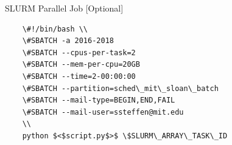 \documentclass{beamer}
\begin{document}
\begin{frame}{SLURM Parallel Job [Optional]}
    \begin{verbatim}
    \#!/bin/bash \\
    \#SBATCH -a 2016-2018
    \#SBATCH --cpus-per-task=2
    \#SBATCH --mem-per-cpu=20GB
    \#SBATCH --time=2-00:00:00
    \#SBATCH --partition=sched\_mit\_sloan\_batch
    \#SBATCH --mail-type=BEGIN,END,FAIL
    \#SBATCH --mail-user=ssteffen@mit.edu
    \\
    python $<$script.py$>$ \$SLURM\_ARRAY\_TASK\_ID
    \end{verbatim}
    \hyperlink{BashFileSlideBack}{}
\end{frame}
\end{document}
